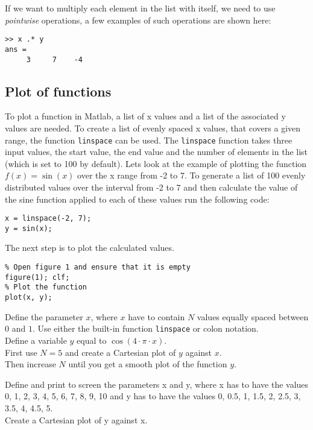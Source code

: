 If we want to multiply each element in the list with itself, we need to use \emph{pointwise} 
operations, a few examples of such operations are shown here:
\begin{lstlisting}
>> x .* y
ans = 
     3     7    -4
\end{lstlisting}




\subsection{Plot of functions}

To plot a function in Matlab, a list of x values and a list of the associated y 
values are needed.
To create a list of evenly spaced x values, that covers a given range, the function
\verb!linspace! can be used.
The \verb!linspace! function takes three input values, the start value, 
the end value and the number of elements in the list (which is set to 100 
by default).
Lets look at the example of plotting the function $f(x) = \sin(x)$ over the x range 
from -2 to 7.
To generate a list of 100 evenly distributed values over the interval from -2 to 7
and then calculate the value of the sine function applied to each of these values
run the following code:
\begin{lstlisting}
x = linspace(-2, 7);
y = sin(x);
\end{lstlisting}
The next step is to plot the calculated values.
\begin{lstlisting}
% Open figure 1 and ensure that it is empty
figure(1); clf;
% Plot the function
plot(x, y);
\end{lstlisting}


\begin{ex}
Define the parameter $x$, where $x$ have to contain $N$ values equally spaced between $0$
and $1$. Use either the built-in function \texttt{linspace} or colon notation.\\
Define a variable $y$ equal to $\cos(4\cdot \pi \cdot x)$.\\
First use $N = 5$ and create a Cartesian plot of $y$ against $x$.\\
Then increase $N$ until you get a smooth plot of the function $y$.
\end{ex}



\begin{ex}
Define and print to screen the parameters x and y, where x has to have the values 0, 1,
2, 3, 4, 5, 6, 7, 8, 9, 10 and y has to have the values 0, 0.5, 1, 1.5, 2, 2.5, 3, 3.5, 4, 4.5,
5.\\
Create a Cartesian plot of y against x.
\end{ex}


